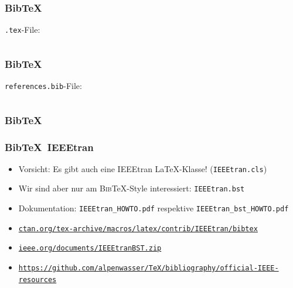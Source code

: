 \documentclass{beamer}                %
\newcommand*\code[1]{\texttt{#1}}
\begin{document}
\begin{frame}[fragile] %
    \frametitle{Bib\TeX}

    \code{.tex}-File:

    \inputminted{tex}{code/bibtex.tex}
\end{frame}
\begin{frame}[fragile] %
    \frametitle{Bib\TeX}

    \code{references.bib}-File:

    \inputminted{tex}{code/references.bib}
\end{frame}
\begin{frame} %
    \frametitle{Bib\TeX}

\end{frame}
\begin{frame} %
    \frametitle{Bib\TeX\ IEEEtran}

    \begin{itemize}
        \item
            \alert{Vorsicht:} Es    gibt     auch    eine    \textsf{IEEEtran}
            \LaTeX-Klasse! (\code{IEEEtran.cls})
        \item
            Wir   sind  aber   nur  am   \textsc{Bib}\TeX-Style  interessiert:
            \code{IEEEtran.\alert{bst}}
        \item
            Dokumentation:         \code{IEEEtran\_HOWTO.pdf}        respektive
            \code{IEEEtran\_bst\_HOWTO.pdf}
        \item
            \href{http://ctan.org/tex-archive/macros/latex/contrib/IEEEtran/bibtex}
                 {\nolinkurl{ctan.org/tex-archive/macros/latex/contrib/IEEEtran/bibtex}}
        \item
            \href{http://www.ieee.org/documents/IEEEtranBST.zip}
                 {\nolinkurl{ieee.org/documents/IEEEtranBST.zip}}
        \item
            \href{https://github.com/alpenwasser/TeX/tree/master/bibliography/official-IEEE-resources}
                 {\nolinkurl{https://github.com/alpenwasser/TeX/bibliography/official-IEEE-resources}}
    \end{itemize}
\end{frame}
\end{document}
